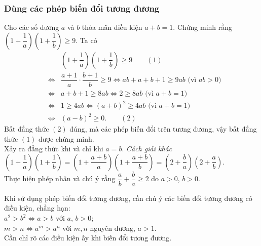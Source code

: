 \subsubsection{Dùng các phép biến đổi tương đương}
\begin{vd}%
	Cho các số dương $a$ và $b$ thỏa mãn điều kiện $a+b=1$. Chứng minh rằng $\left(1+\dfrac{1}{a}\right)\left(1+\dfrac{1}{b}\right)\geq 9.$
	\loigiai
	{
	Ta có \begin{eqnarray*}
		&&\left(1+\dfrac{1}{a}\right)\left(1+\dfrac{1}{b}\right)\geq 9 \quad\quad (1)\\%
		&\Leftrightarrow& \dfrac{a+1}{a}\cdot \dfrac{b+1}{b}\geq 9\Leftrightarrow ab+a+b+1\geq 9ab \text{ (vì $ab>0$)}\\
		&\Leftrightarrow& a+b+1\geq 8ab\Leftrightarrow 2\geq 8ab \text{ (vì $a+b=1$)}\\
		&\Leftrightarrow& 1\geq 4ab\Leftrightarrow (a+b)^2\geq 4ab \text{ (vì $a+b=1$)}\\
		&\Leftrightarrow& (a-b)^2\geq 0.\quad\quad (2)
	\end{eqnarray*}
	Bất đẳng thức $(2)$ đúng, mà các phép biến đổi trên tương đương, vậy bất đẳng thức $(1)$ được chứng minh.\\
	Xảy ra đẳng thức khi và chỉ khi $a=b$.
	\textit{Cách giải khác}\\
	$\left(1+\dfrac{1}{a}\right)\left(1+\dfrac{1}{b}\right)=\left(1+\dfrac{a+b}{a}\right)\left(1+\dfrac{a+b}{b}\right)=\left(2+\dfrac{b}{a}\right)(2+\dfrac{a}{b})$.\\
	Thực hiện phép nhân và chú ý rằng $\dfrac{a}{b}+\dfrac{b}{a}\geq 2$ do $a>0$, $b>0$.\\
	}
\end{vd}
	\begin{note}
	Khi sử dụng phép biến đổi tương đương, cần chú ý các biến đổi tương đương có điều kiện, chẳng hạn:\\
	$a^2>b^2\Leftrightarrow a>b$ với $a,\, b>0$;\\
	$m>n\Leftrightarrow a^m>a^n$ với $m,n$ nguyên dương, $a>1$.\\
	Cần chỉ rõ các điều kiện ấy khi biến đổi tương đương.
\end{note}
